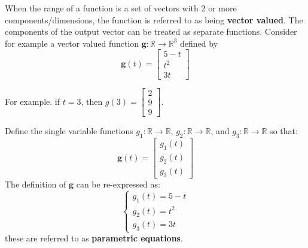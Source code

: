 \documentclass{article}
\begin{document}
When the range of a function is a set of vectors with 2 or more components/dimensions, the function is referred to as being {\bf vector valued}. The components of the output vector can be treated as separate functions. Consider for example a vector valued function \(\mathbf{g}: \mathbb{R} \rightarrow \mathbb{R}^3\) defined by 
\[\mathbf{g}(t) = \begin{bmatrix} 5 - t \\ t^2 \\ 3t \end{bmatrix}\]

For example. if \(t = 3\), then \(g(3) = \begin{bmatrix} 2 \\ 9 \\ 9 \end{bmatrix}\).

Define the single variable functions \(g_1 : \mathbb{R} \rightarrow \mathbb{R}\), \(g_2 : \mathbb{R} \rightarrow \mathbb{R}\), and \(g_3 : \mathbb{R} \rightarrow \mathbb{R}\) so that: 
\[\mathbf{g}(t) = \begin{bmatrix} g_1(t) \\ g_2(t) \\ g_3(t) \end{bmatrix}\]    
The definition of \(\mathbf{g}\) can be re-expressed as:
\[\left\{\begin{array}{c}
g_1(t) = 5 - t \\ 
g_2(t) = t^2 \\ 
g_3(t) = 3t 
\end{array}\right.\]    
these are referred to as {\bf parametric equations}.
\end{document}
